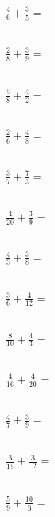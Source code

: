 \documentclass{article}
\begin{document}
\huge

\(\frac{4}{6} + \frac{3}{5} = \)\\\

\(\frac{2}{8} + \frac{3}{9} = \)\\\

\(\frac{5}{8} + \frac{4}{2} = \)\\\

\(\frac{2}{6} + \frac{4}{8} = \)\\\

\(\frac{3}{7} + \frac{7}{3} = \)\\\

\(\frac{4}{20} + \frac{3}{9} = \)\\\

\(\frac{4}{3} + \frac{3}{8} = \)\\\

\(\frac{3}{6} + \frac{4}{12} = \)\\\

\(\frac{8}{10} + \frac{4}{3} = \)\\\

\(\frac{4}{16} + \frac{4}{20} = \)\\\

\(\frac{4}{7} + \frac{3}{9} = \)\\\

\(\frac{3}{15} + \frac{3}{12} = \)\\\

\(\frac{5}{9} + \frac{10}{6} = \)\\\
\end{document}
